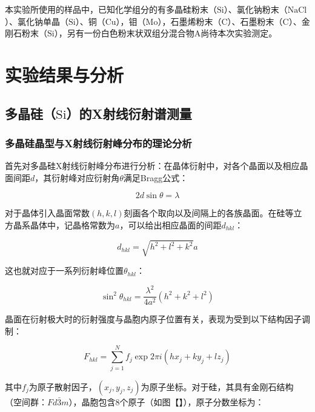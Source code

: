 \documentclass{thuemp}
\begin{document}
本实验所使用的样品中，已知化学组分的有多晶硅粉末（$\text{Si}$）、氯化钠粉末（$\text{NaCl}$）、氯化钠单晶（$\text{Si}$）、铜（$\text{Cu}$），钼（$\text{Mo}$），石墨烯粉末（$\text{C}$）、石墨粉末（$\text{C}$）、金刚石粉末（$\text{Si}$），另有一份白色粉末状双组分混合物A尚待本次实验测定。

\section{实验结果与分析}

\subsection{多晶硅（$\text{Si}$）的X射线衍射谱测量}

\subsubsection{多晶硅晶型与X射线衍射峰分布的理论分析}

首先对多晶硅X射线衍射峰分布进行分析：在晶体衍射中，对各个晶面以及相应晶面间距$d$，其衍射峰对应衍射角$\theta$满足Bragg公式：

\begin{equation}
    2d\sin\theta  = \lambda
    \label{eq:bragg}
\end{equation}

对于晶体引入晶面常数$(h,k,l)$刻画各个取向以及间隔上的各族晶面。在硅等立方晶系晶体中，记晶格常数为$a$，可以给出相应晶面的间距$d_{hkl}$：

\begin{equation}
    d_{hkl} = \sqrt{h^2+l^2+k^2} a
    \label{eq:d_hkl}
\end{equation}

这也就对应于一系列衍射峰位置$\theta_{hkl}$：

\begin{equation}
    \sin^2 \theta_{hkl} = \frac{\lambda^2}{4a^2}(h^2+k^2+l^2)
    \label{eq:theta_hkl}
\end{equation}

晶面在衍射极大时的衍射强度与晶胞内原子位置有关，表现为受到以下结构因子调制：

\begin{equation}
    F_{hkl} = \sum_{j = 1}^{N} f_j \exp{2\pi i (hx_j + ky_j + lz_j)}
    \label{eq:structure_factor}
\end{equation}

其中$f_j$为原子散射因子，$(x_j,y_j,z_j)$为原子坐标。对于硅，其具有金刚石结构（空间群：$Fd\bar{3}m$），晶胞包含8个原子（如图【】），原子分数坐标为：
\end{document}
